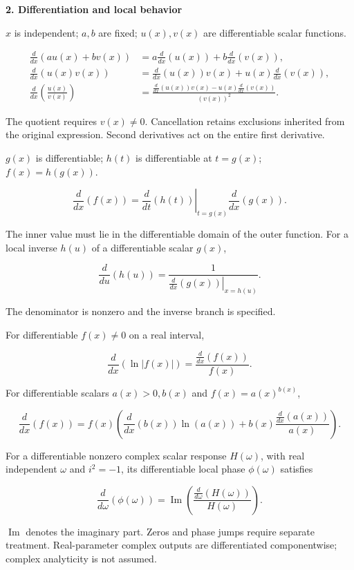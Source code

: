 \documentclass[11pt,oneside,openany]{book}
\begin{document}
\newpage
{\sffamily\large\bfseries 2. Differentiation and local behavior\par}\vspace{5pt}
\begin{minipage}[t]{0.485\textwidth}\vspace{0pt}

\(x\) is independent; \(a,b\) are fixed; \(u(x),v(x)\) are differentiable scalar functions.

\[
\begin{aligned}
\frac{d}{dx}(au(x)+bv(x))
&=a\frac{d}{dx}(u(x))+b\frac{d}{dx}(v(x)),\\
\frac{d}{dx}(u(x)v(x))
&=\frac{d}{dx}(u(x))v(x)+u(x)\frac{d}{dx}(v(x)),\\
\frac{d}{dx}\left(\frac{u(x)}{v(x)}\right)
&=\frac{\frac{d}{dx}(u(x))v(x)-u(x)\frac{d}{dx}(v(x))}{(v(x))^2}.
\end{aligned}
\]

The quotient requires \(v(x)\ne0\). Cancellation retains exclusions inherited
from the original expression. Second derivatives act on the entire first derivative.


\(g(x)\) is differentiable; \(h(t)\) is differentiable at \(t=g(x)\);
\(f(x)=h(g(x))\).

\[
\frac{d}{dx}(f(x))
=\left.\frac{d}{dt}(h(t))\right|_{t=g(x)}\frac{d}{dx}(g(x)).
\]

The inner value must lie in the differentiable domain of the outer function.
For a local inverse \(h(u)\) of a differentiable scalar \(g(x)\),

\[
\frac{d}{du}(h(u))
=\frac{1}{\left.\frac{d}{dx}(g(x))\right|_{x=h(u)}}.
\]

The denominator is nonzero and the inverse branch is specified.


For differentiable \(f(x)\ne0\) on a real interval,

\[
\frac{d}{dx}(\ln|f(x)|)=\frac{\frac{d}{dx}(f(x))}{f(x)}.
\]

For differentiable scalars \(a(x)>0,b(x)\) and \(f(x)=a(x)^{b(x)}\),

\[
\frac{d}{dx}(f(x))
=f(x)\left(\frac{d}{dx}(b(x))\ln(a(x))
+b(x)\frac{\frac{d}{dx}(a(x))}{a(x)}\right).
\]

For a differentiable nonzero complex scalar response \(H(\omega)\), with real
independent \(\omega\) and \(i^2=-1\), its differentiable local phase
\(\phi(\omega)\) satisfies

\[
\frac{d}{d\omega}(\phi(\omega))
=\operatorname{Im}\left(\frac{\frac{d}{d\omega}(H(\omega))}{H(\omega)}\right).
\]

\(\operatorname{Im}\) denotes the imaginary part. Zeros and phase jumps require separate treatment. Real-parameter complex
outputs are differentiated componentwise; complex analyticity is not assumed.
\end{minipage}%
\end{document}
